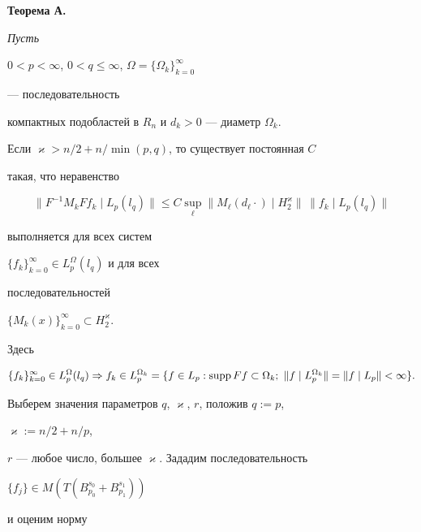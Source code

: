 {\bf Теорема А.}{\it Пусть


$0<p<\infty$, $0<q\le\infty$, $\Omega=\{\Omega_k\}^\infty_{k=0}$ 


--- последовательность 


компактных подобластей в $R_n$ и $d_k>0$ --- диаметр $\Omega_k$. 


Если $\varkappa>n/2+n/\min(p,q)$, то существует постоянная $C$ 


такая, что неравенство 


$$ 


\|F^{-1}M_k Ff_k\mid L_p(l_q)\|\le C\sup_\ell 


\|M_\ell(d_\ell\cdot)\mid H^\varkappa_2\|\, 


\|f_k\mid L_p(l_q)\| 


$$ 


выполняется для всех систем 


$\{f_k\}^\infty_{k=0}\in L^\Omega_p(l_q)$ и для всех 


последовательностей 


$\{M_k(x)\}^\infty_{k=0}\subset H^\varkappa_2$. 


Здесь 


$$ 


\{f_k\}^\infty_{k=0}\in L^\Omega_p(l_q)\Rightarrow 


f_k\in L^{\Omega_k}_p=\{f\in L_p:\supp Ff\subset \Omega_k;\  


\|f\mid L^{\Omega_k}_p\|=\|f\mid L_p\|<\infty\}. 


$$ 


} 


\medskip 


 


Выберем значения параметров $q$, $\varkappa$, $r$, положив $q:=p$, 


$\varkappa:=n/2+n/p$, 


$r$ --- любое число, большее $\varkappa$. Зададим последовательность 


$\{f_j\}\in M(T(B^{s_0}_{p_0}+B^{s_1}_{p_1}))$ 


и оценим норму 


